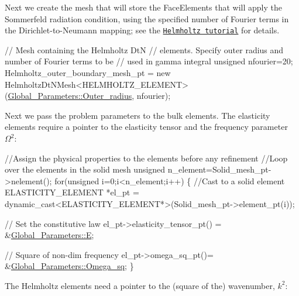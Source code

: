 Next we create the mesh that will store the {\ttfamily Face\+Elements} that will apply the Sommerfeld radiation condition, using the specified number of Fourier terms in the Dirichlet-\/to-\/\+Neumann mapping; see the \href{../../../helmholtz/scattering/html/index.html#DtN}{\tt Helmholtz tutorial} for details.


\begin{DoxyCodeInclude}


 \textcolor{comment}{// Mesh containing the Helmholtz DtN}
 \textcolor{comment}{// elements. Specify outer radius and number of Fourier terms to be}
 \textcolor{comment}{// used in gamma integral}
 \textcolor{keywordtype}{unsigned} nfourier=20;
 Helmholtz\_outer\_boundary\_mesh\_pt = 
  \textcolor{keyword}{new} HelmholtzDtNMesh<HELMHOLTZ\_ELEMENT>(\hyperlink{namespaceGlobal__Parameters_a88ded445ecd7bd89701409e68fd0b900}{Global\_Parameters::Outer\_radius},
                                          nfourier);

\end{DoxyCodeInclude}


Next we pass the problem parameters to the bulk elements. The elasticity elements require a pointer to the elasticity tensor and the frequency parameter $ \Omega^2 $\+:


\begin{DoxyCodeInclude}
 
 \textcolor{comment}{//Assign the physical properties to the elements before any refinement}
 \textcolor{comment}{//Loop over the elements in the solid mesh}
 \textcolor{keywordtype}{unsigned} n\_element=Solid\_mesh\_pt->nelement();
 \textcolor{keywordflow}{for}(\textcolor{keywordtype}{unsigned} i=0;i<n\_element;i++)
  \{
   \textcolor{comment}{//Cast to a solid element}
   ELASTICITY\_ELEMENT *el\_pt = 
    \textcolor{keyword}{dynamic\_cast<}ELASTICITY\_ELEMENT*\textcolor{keyword}{>}(Solid\_mesh\_pt->element\_pt(i));
   
   \textcolor{comment}{// Set the constitutive law}
   el\_pt->elasticity\_tensor\_pt() = &\hyperlink{namespaceGlobal__Parameters_aeeb26e11ef275bdfce14710e00290bb6}{Global\_Parameters::E};

   \textcolor{comment}{// Square of non-dim frequency}
   el\_pt->omega\_sq\_pt()= &\hyperlink{namespaceGlobal__Parameters_af9e1e178dfb7f5e35b452599bd4c4324}{Global\_Parameters::Omega\_sq};
  \}

\end{DoxyCodeInclude}


The Helmholtz elements need a pointer to the (square of the) wavenumber, $ k^2 $\+:


